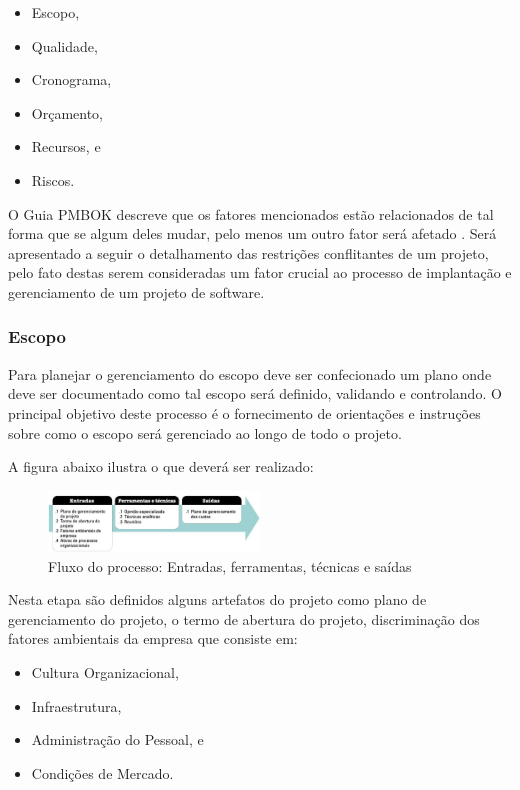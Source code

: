 \documentclass{acm_proc_article-sp}
\begin{document}
\begin{itemize}
\item Escopo,
\item Qualidade,
\item Cronograma,
\item Orçamento,
\item Recursos, e 
\item Riscos.
\end{itemize}


O Guia PMBOK descreve que os fatores mencionados estão relacionados de tal forma que se algum deles mudar, pelo menos um outro fator será afetado \cite{pmbok:nAgil}. Será apresentado a seguir o detalhamento das restrições conflitantes de um projeto, pelo fato destas serem consideradas um fator crucial ao processo de implantação e gerenciamento de um projeto de software.  

\subsubsection*{Escopo}
Para planejar o gerenciamento do escopo deve ser confecionado um plano onde deve ser documentado como tal escopo será definido, validando e controlando. O principal objetivo deste processo é o fornecimento de orientações e instruções sobre como o escopo será gerenciado ao longo de todo o projeto.

A figura abaixo ilustra o que deverá ser realizado:

\begin{figure}[h]
\centering %
\includegraphics[width=0.5\textwidth]{entradaescopo.jpg} %
\caption{Fluxo do processo: Entradas, ferramentas, técnicas e saídas \cite{fluxosProcessos:pmbok}}
\end{figure}

Nesta etapa são definidos alguns artefatos do projeto como plano de gerenciamento do projeto, o termo de abertura do projeto, discriminação dos fatores ambientais da empresa que consiste em:

\begin{itemize}
\item Cultura Organizacional,
\item Infraestrutura,
\item Administração do Pessoal, e
\item Condições de Mercado.
\end{itemize} 
\end{document}

